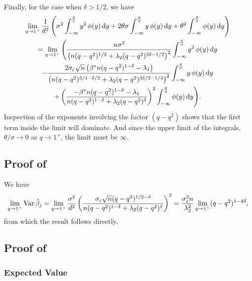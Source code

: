 Finally, for the case when \(\delta > 1/2\), we have
\begin{multline}
  \label{eq:var-deltagthalf-integral}
  \lim_{q \rightarrow 1^+} \frac{1}{d^2} \left(\sigma^2 \int_{-\infty}^\frac{\theta}{\sigma} y^2 \operatorname{\phi}(y) \mathop{}\!\mathrm{d} y + 2 \theta \sigma \int_{-\infty}^\frac{\theta}{\sigma} y \operatorname{\phi}(y) \mathop{}\!\mathrm{d} y + \theta^2 \int_{-\infty}^\frac{\theta}{\sigma} \operatorname{\phi}(y) \mathop{}\!\mathrm{d} y\right) \\
  = \lim_{q \rightarrow 1^+} \Bigg( \frac{n \sigma^2}{ \left(n (q-q^2)^{1/2} + \lambda_2(q-q^2)^{2\delta - 1/2}\right)^2} \int_{-\infty}^\frac{\theta}{\sigma} y^2 \operatorname{\phi}(y) \mathop{}\!\mathrm{d} y
  \\- \frac{2\sigma_\varepsilon \sqrt{n}\left(\beta^* n (q- q^2)^{1 - \delta} - \lambda_1\right)}{\left(n(q-q^2)^{3/4 - \delta/2} + \lambda_2(q-q^2)^{3\delta / 2 - 1/4}\right)^2} \int_{-\infty}^\frac{\theta}{\sigma} y \operatorname{\phi}(y) \mathop{}\!\mathrm{d} y \\
  + \left(\frac{-\beta^*n(q-q^2)^{1-\delta} - \lambda_1}{n(q-q^2)^{1-\delta} + \lambda_2(q-q^2)^\delta}\right)^2 \int_{-\infty}^\frac{\theta}{\sigma} \operatorname{\phi}(y) \mathop{}\!\mathrm{d} y\Bigg).
\end{multline}
Inspection of the exponents involving the factor \((q - q^2)\) shows that the first term inside the limit will dominate. And since the upper limit of the integrals, \(\theta/\sigma \rightarrow  0\)  as \(q \rightarrow 1^+\), the limit must be \(\infty\).

\subsection{Proof of }

We have
\begin{equation*}
  \lim_{q\rightarrow 1^+}\operatorname{Var} \hat{\beta}_j = \lim_{q \rightarrow 1^+}\frac{\sigma^2}{d^2} \left(\frac{\sigma_\varepsilon \sqrt{n} (q - q^2)^{1/2 - \delta}}{n (q-q^2)^{1 - \delta} + \lambda_2 (q-q^2)^\delta}\right)^2
  = \frac{\sigma_\varepsilon^2 n}{\lambda_2^2} \lim_{q \rightarrow 1^+}(q-q^2)^{1 - 4\delta},
\end{equation*}
from which the result follows directly.

\subsection{Proof of }

\subsubsection{Expected Value}

